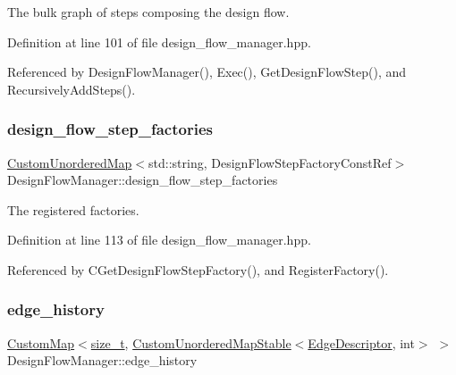 The bulk graph of steps composing the design flow. 



Definition at line 101 of file design\+\_\+flow\+\_\+manager.\+hpp.



Referenced by Design\+Flow\+Manager(), Exec(), Get\+Design\+Flow\+Step(), and Recursively\+Add\+Steps().

\mbox{\label{classDesignFlowManager_a4e7a87bc3009946842d3c41a05f6ea6f}} 
\subsubsection{\texorpdfstring{design\+\_\+flow\+\_\+step\+\_\+factories}{design\_flow\_step\_factories}}
{\footnotesize\ttfamily \hyperlink{custom__map_8hpp_ad1ed68f2ff093683ab1a33522b144adc}{Custom\+Unordered\+Map}$<$std\+::string, Design\+Flow\+Step\+Factory\+Const\+Ref$>$ Design\+Flow\+Manager\+::design\+\_\+flow\+\_\+step\+\_\+factories\hspace{0.3cm}{\ttfamily [private]}}



The registered factories. 



Definition at line 113 of file design\+\_\+flow\+\_\+manager.\+hpp.



Referenced by C\+Get\+Design\+Flow\+Step\+Factory(), and Register\+Factory().

\mbox{\label{classDesignFlowManager_ad81eea42b4dd034b2ba9a5b61dcb84bf}} 
\subsubsection{\texorpdfstring{edge\+\_\+history}{edge\_history}}
{\footnotesize\ttfamily \hyperlink{custom__map_8hpp_a18ca01763abbe3e5623223bfe5aaac6b}{Custom\+Map}$<$\hyperlink{tutorial__fpt__2017_2intro_2sixth_2test_8c_a7c94ea6f8948649f8d181ae55911eeaf}{size\+\_\+t}, \hyperlink{custom__map_8hpp_a7314a7df1cdb3a3acf478ab86e95c226}{Custom\+Unordered\+Map\+Stable}$<$\hyperlink{graph_8hpp_a9eb9afea34e09f484b21f2efd263dd48}{Edge\+Descriptor}, int$>$ $>$ Design\+Flow\+Manager\+::edge\+\_\+history\hspace{0.3cm}{\ttfamily [private]}}



